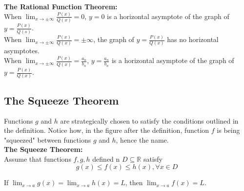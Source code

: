 \documentclass{article}
\begin{document}
            \noindent \color{purple} \textbf{The Rational Function Theorem:} \color{black} \\
            \noindent When $\lim_{x\to\pm\infty}\frac{P(x)}{Q(x)}=0$, $y=0$ is a horizontal asymptote
            of the graph of $y=\frac{P(x)}{Q(s)}$. \\
            When $\lim_{x\to\pm\infty}\frac{P(x)}{Q(x)}=\pm\infty$, the graph of $y=\frac{P(x)}{Q(x)}$
            has no horizontal asymptotes. \\
            When $\lim_{x\to\pm\infty}\frac{P(x)}{Q(x)}=\frac{a_n}{b_n}$, $y=\frac{a_n}{b_n}$ is a
            horizontal asymptote of the graph of $y=\frac{P(x)}{Q(x)}$.

        \pagebreak
        \subsection{The Squeeze Theorem}
            Functions $g$ and $h$ are strategically chosen to satisfy the conditions outlined in the
            definition. Notice how, in the figure after the definition, function $f$ is being
            "squeezed" between functions $g$ and $h$, hence the name. \\

            \noindent \color{purple} \textbf{The Squeeze Theorem:} \color{black} \\
            Assume that functions $f,g,h$ defined n $D\subseteq\mathbb{R}$ satisfy \\

            \begin{equation*}
                g(x)\leq f(x)\leq h(x),\forall x\in D
            \end{equation*}

            \noindent If $\lim_{x\to a}g(x)=\lim_{x\to a}h(x)=L$, then $\lim_{x\to a}f(x)=L$. \\
\end{document}
